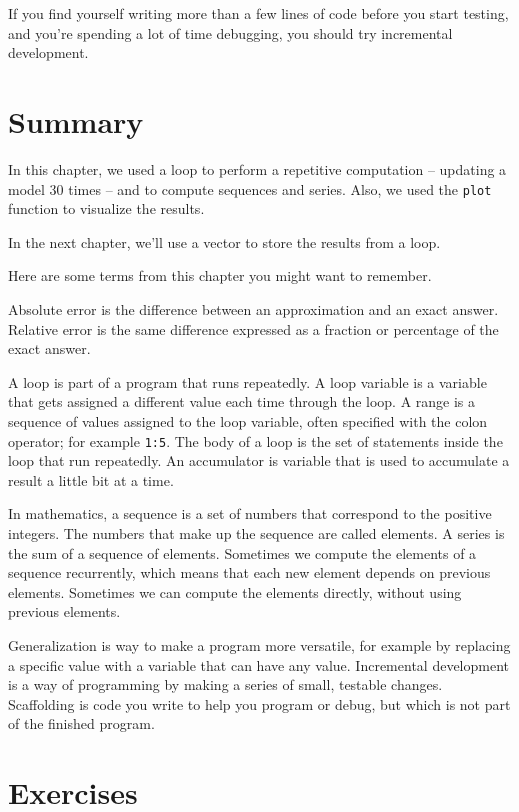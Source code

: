 If you find yourself writing more than a few lines of code before
you start testing, and you're spending a lot of time debugging,
you should try incremental development.




\section{Summary}

In this chapter, we used a loop to perform a repetitive computation -- updating a model 30 times -- and to compute sequences and series.  Also, we used the {\tt plot} function to visualize the results.

In the next chapter, we'll use a vector to store the results from a loop.

Here are some terms from this chapter you might want to remember.

Absolute error is the difference between an approximation and
an exact answer. Relative error is the same difference expressed as a fraction or percentage of the exact answer.

A loop is part of a program that runs repeatedly.  A loop variable is a variable
that gets assigned a different value each time through the loop.
A range is a sequence of values assigned to the loop variable, often
specified with the colon operator; for example {\tt 1:5}.
The body of a loop is the set of statements inside the loop that run repeatedly.
An accumulator is variable that is used to accumulate a result a little bit at a time.

In mathematics, a sequence is a set of numbers that correspond
to the positive integers.
The numbers that make up the sequence are called elements.  A series is the sum of a sequence of elements.
Sometimes we compute the elements of a sequence recurrently, which means that each new element depends on previous elements.  Sometimes we can compute the elements directly, without using previous elements.

Generalization is way to make a program more versatile, for example by replacing a specific value with a variable that can have any value.
Incremental development is a way of programming by making a series of small, testable changes.
Scaffolding is code you write to help you program or debug, but
which is not part of the finished program.


\section{Exercises}

